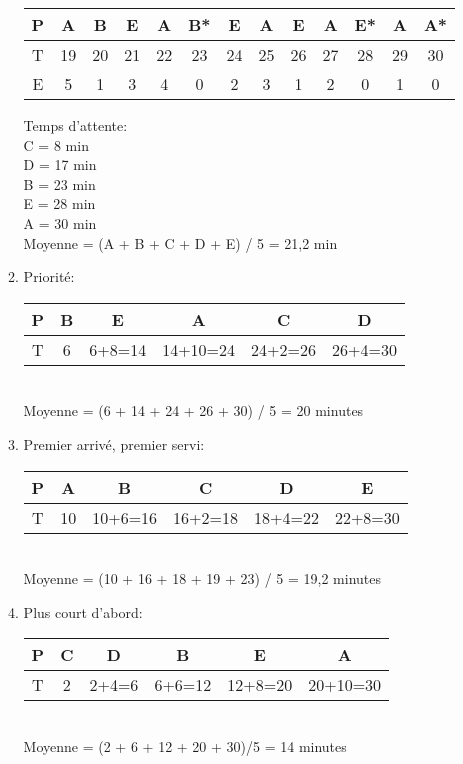 \begin{enumerate}
\begin{correction}
\begin{enumerate}[label=(\alph*)]
      \begin{tabular}{|c||c|c|c|c|c|c|c|c|c|c|c|c|}
      \hline
      P & A & B & E & A & B{*} & E & A & E & A & E{*} & A & A{*}\tabularnewline
      \hline
      T & 19 & 20 & 21 & 22 & 23 & 24 & 25 & 26 & 27 & 28 & 29 & 30\tabularnewline
      \hline
      E & 5 & 1 & 3 & 4 & 0 & 2 & 3 & 1 & 2 & 0 & 1 & 0\tabularnewline
      \hline
      \end{tabular}

      Temps d’attente:\\
      C = 8 min\\
      D = 17 min\\
      B = 23 min\\
      E = 28 min\\
      A = 30 min\\
      Moyenne = (A + B + C + D + E) / 5 = 21,2 min

\item Priorité:\\
      \begin{tabular}{|c||c|c|c|c|c|}
      \hline
      P & B & E & A & C & D\tabularnewline
      \hline
      T & 6 & 6+8=14 & 14+10=24 & 24+2=26 & 26+4=30\tabularnewline
      \hline
      \end{tabular}\\
      Moyenne = (6 + 14 + 24 + 26 + 30) / 5 = 20 minutes

\item Premier arrivé, premier servi:\\
      \begin{tabular}{|c||c|c|c|c|c|}
      \hline
      P & A & B & C & D & E\tabularnewline
      \hline
      T & 10 & 10+6=16 & 16+2=18 & 18+4=22 & 22+8=30\tabularnewline
      \hline
      \end{tabular}\\
      Moyenne = (10 + 16 + 18 + 19 + 23) / 5 = 19,2 minutes

\item Plus court d’abord:\\
      \begin{tabular}{|c||c|c|c|c|c|}
      \hline
      P & C & D & B & E & A\tabularnewline
      \hline
      T & 2 & 2+4=6 & 6+6=12 & 12+8=20 & 20+10=30\tabularnewline
      \hline
      \end{tabular}\\
      Moyenne = (2 + 6 + 12 + 20 + 30)/5 = 14 minutes
\end{enumerate}
\end{correction}

\end{enumerate}


